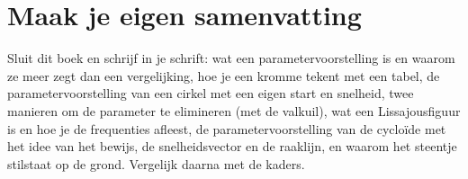 \begin{oefeningen}






\end{oefeningen}


\ifzelfstudie
\section*{Maak je eigen samenvatting}
Sluit dit boek en schrijf in je schrift: wat een parametervoorstelling is en waarom ze meer zegt dan een vergelijking, hoe je een kromme tekent met een tabel, de parametervoorstelling van een cirkel met een eigen start en snelheid, twee manieren om de parameter te elimineren (met de valkuil), wat een Lissajousfiguur is en hoe je de frequenties afleest, de parametervoorstelling van de cycloïde met het idee van het bewijs, de snelheidsvector en de raaklijn, en waarom het steentje stilstaat op de grond. Vergelijk daarna met de kaders.
\fi
